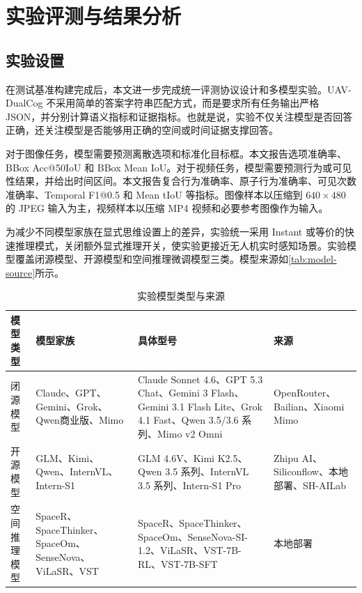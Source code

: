 
\chapter{实验评测与结果分析}

\section{实验设置}

在测试基准构建完成后，本文进一步完成统一评测协议设计和多模型实验。UAV-DualCog 不采用简单的答案字符串匹配方式，而是要求所有任务输出严格 JSON，并分别计算语义指标和证据指标。也就是说，实验不仅关注模型是否回答正确，还关注模型是否能够用正确的空间或时间证据支撑回答。

对于图像任务，模型需要预测离散选项和标准化目标框。本文报告选项准确率、BBox Acc@50IoU 和 BBox Mean IoU。对于视频任务，模型需要预测行为或可见性结果，并给出时间区间。本文报告复合行为准确率、原子行为准确率、可见次数准确率、Temporal F1@0.5 和 Mean tIoU 等指标。图像样本以压缩到 \(640\times480\) 的 JPEG 输入为主，视频样本以压缩 MP4 视频和必要参考图像作为输入。

为减少不同模型家族在显式思维设置上的差异，实验统一采用 Instant 或等价的快速推理模式，关闭额外显式推理开关，使实验更接近无人机实时感知场景。实验模型覆盖闭源模型、开源模型和空间推理微调模型三类。模型来源如\autoref{tab:model-source}所示。

\begin{table}[htbp]
    \centering
    \caption{实验模型类型与来源}
    \label{tab:model-source}
    \begin{tabularx}{\textwidth}{p{2.2cm}p{2.7cm}X p{2.6cm}}
        \toprule
        模型类型 & 模型家族 & 具体型号 & 来源 \\
        \midrule
        闭源模型 & Claude、GPT、Gemini、Grok、Qwen商业版、Mimo & Claude Sonnet 4.6、GPT 5.3 Chat、Gemini 3 Flash、Gemini 3.1 Flash Lite、Grok 4.1 Fast、Qwen 3.5/3.6 系列、Mimo v2 Omni & OpenRouter、Bailian、Xiaomi Mimo \\
        开源模型 & GLM、Kimi、Qwen、InternVL、Intern-S1 & GLM 4.6V、Kimi K2.5、Qwen 3.5 系列、InternVL 3.5 系列、Intern-S1 Pro & Zhipu AI、Siliconflow、本地部署、SH-AILab \\
        空间推理模型 & SpaceR、SpaceThinker、SpaceOm、SenseNova、ViLaSR、VST & SpaceR、SpaceThinker、SpaceOm、SenseNova-SI-1.2、ViLaSR、VST-7B-RL、VST-7B-SFT & 本地部署 \\
        \bottomrule
    \end{tabularx}
\end{table}

